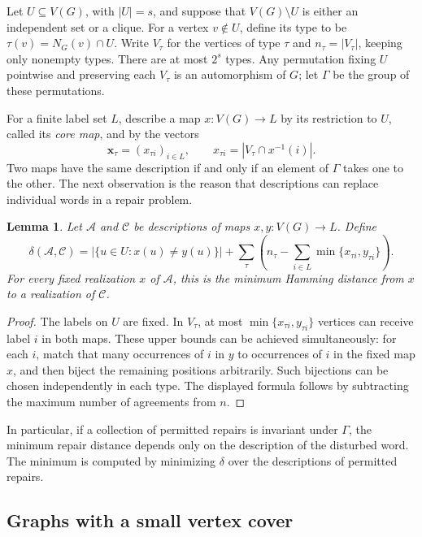 \documentclass[10pt,a4paper]{amsart}
\numberwithin{equation}{section}
\newtheorem{lemma}[theorem]{Lemma}
\theoremstyle{definition}
\theoremstyle{remark}
\begin{document}
Let $U\subseteq V(G)$, with $|U|=s$, and suppose that
$V(G)\setminus U$ is either an independent set or a clique.
For a vertex $v\notin U$, define its type to be
$\tau(v)=N_G(v)\cap U$. Write $V_\tau$ for the vertices of type
$\tau$ and $n_\tau=|V_\tau|$, keeping only nonempty types.
There are at most $2^s$ types. Any permutation fixing $U$ pointwise
and preserving each $V_\tau$ is an automorphism of $G$; let $\Gamma$
be the group of these permutations.

For a finite label set $L$, describe a map $x:V(G)\to L$ by its
restriction to $U$, called its \emph{core map}, and by the vectors
\[
\mathbf x_\tau=(x_{\tau i})_{i\in L},\qquad
x_{\tau i}=|V_\tau\cap x^{-1}(i)|.
\]
Two maps have the same description if and only if an element of
$\Gamma$ takes one to the other. The next observation is the reason
that descriptions can replace individual words in a repair problem.

\begin{lemma}\label{rec:distance}
Let $\mathcal A$ and $\mathcal C$ be descriptions of maps $x,y:V(G)\to L$.
Define
\[
\delta(\mathcal A,\mathcal C)
=|\{u\in U:x(u)\neq y(u)\}|
+\sum_\tau\left(n_\tau-\sum_{i\in L}
\min\{x_{\tau i},y_{\tau i}\}\right).
\]
For every fixed realization $x$ of $\mathcal A$, this is the minimum
Hamming distance from $x$ to a realization of $\mathcal C$.
\end{lemma}
\begin{proof}
The labels on $U$ are fixed. In $V_\tau$, at most
$\min\{x_{\tau i},y_{\tau i}\}$ vertices can receive label $i$ in
both maps. These upper bounds can be achieved simultaneously: for
each $i$, match that many occurrences of $i$ in $y$ to occurrences
of $i$ in the fixed map $x$, and then biject the remaining positions
arbitrarily. Such bijections can be chosen independently in each
type. The displayed formula follows by subtracting the maximum
number of agreements from $n$.
\end{proof}

In particular, if a collection of permitted repairs is invariant
under $\Gamma$, the minimum repair distance depends only on the
description of the disturbed word. The minimum is computed by
minimizing $\delta$ over the descriptions of permitted repairs.

\subsection{Graphs with a small vertex cover}
\end{document}
